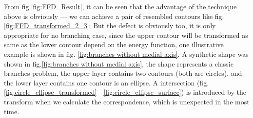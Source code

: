 \documentclass[3p,times]{elsarticle}
\begin{document}
From fig.\ref{fig:FFD_Result}, it can be seen that the advantage of
the technique above is obviously --- we can achieve a pair of resembled contours like
fig.\ref{fig:FFD_transformed_2_3}; But the defect is obviously too, it is
only appropriate for no branching case, since the upper contour will
be transformed as same as the lower contour depend on the energy
function, one illustrative example is shown in fig. \ref{fig:branches
  without medial axis}. A synthetic shape was shown in
fig.\ref{fig:branches without medial axis}, the shape represents a
classic branches problem, the upper layer contains two contours (both
are circles), and the lower layer contains one contour is an
ellipse. A intersection (fig.\ref{fig:circle_ellipse_transformed}---\ref{fig:circle_ellipse_surface}) is
introduced by the transform when we calculate the correspondence,
which is unexpected in the most time. 
\end{document}
